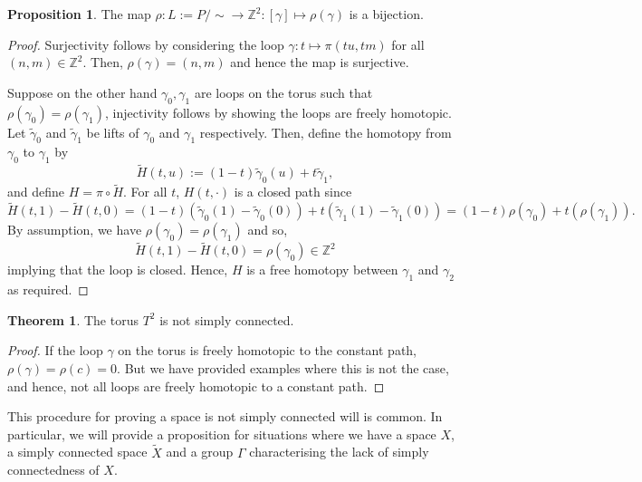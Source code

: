 \documentclass[]{article}
\theoremstyle{definition}
\newtheorem{theorem}{Theorem}
\theoremstyle{definition}
\newtheorem{proposition}{Proposition}[section]
\begin{document}
\begin{proposition}
  The map \(\rho : L := P / \sim \to \mathbb{Z}^2 : [\gamma] \mapsto \rho(\gamma)\)
  is a bijection.
\end{proposition}
\begin{proof}
  Surjectivity follows by considering the loop \(\gamma : t \mapsto \pi(tu, tm)\) for all 
  \((n, m) \in \mathbb{Z}^2\). Then, \(\rho(\gamma) = (n, m)\) and hence the map 
  is surjective.

  Suppose on the other hand \(\gamma_0, \gamma_1\) are loops on the torus such that 
  \(\rho(\gamma_0) = \rho(\gamma_1)\), injectivity follows by showing the loops are 
  freely homotopic. Let \(\tilde \gamma_0\) and \(\tilde \gamma_1\) be lifts of 
  \(\gamma_0\) and \(\gamma_1\) respectively. Then, define the homotopy from 
  \(\gamma_0\) to \(\gamma_1\) by
  \[\tilde H(t, u) := (1 - t)\tilde \gamma_0(u) + t \tilde \gamma_1,\]
  and define \(H = \pi \circ \tilde H\). For all \(t\), \(H(t, \cdot)\) is a 
  closed path since 
  \[\tilde H(t, 1) - \tilde H(t, 0) = (1 - t)(\tilde \gamma_0(1) - \tilde \gamma_0(0))
    + t(\tilde \gamma_1(1) - \tilde \gamma_1(0)) = (1 - t)\rho(\gamma_0) + t(\rho(\gamma_1)).\]
  By assumption, we have \(\rho(\gamma_0) = \rho(\gamma_1)\) and so, 
  \[\tilde H(t, 1) - \tilde H(t, 0) = \rho(\gamma_0) \in \mathbb{Z}^2\]
  implying that the loop is closed. Hence, \(H\) is a free homotopy between 
  \(\gamma_1\) and \(\gamma_2\) as required.
\end{proof}

\begin{theorem}
  The torus \(T^2\) is not simply connected.
\end{theorem}
\begin{proof}
  If the loop \(\gamma\) on the torus is freely homotopic to the constant path, 
  \(\rho(\gamma) = \rho(c) = 0\). But we have provided examples where this is not the case, 
  and hence, not all loops are freely homotopic to a constant path.
\end{proof}

This procedure for proving a space is not simply connected will is common. In particular, 
we will provide a proposition for situations where we have a space \(X\), a simply 
connected space \(\tilde X\) and a group \(\Gamma\) 
characterising the lack of simply connectedness of \(X\).
\end{document}
